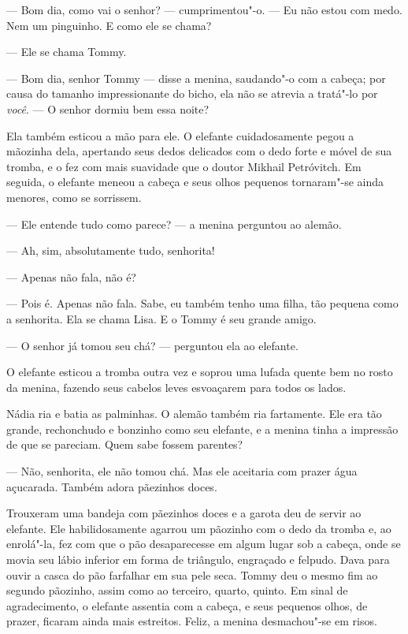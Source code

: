 --- Bom dia, como vai o senhor? --- cumprimentou"-o. --- Eu não estou com
medo. Nem um pinguinho. E como ele se chama?

--- Ele se chama Tommy.

--- Bom dia, senhor Tommy --- disse a menina, saudando"-o com a cabeça;
por causa do tamanho impressionante do bicho, ela não se atrevia a
tratá"-lo por \emph{você}. --- O senhor dormiu bem essa noite?

Ela também esticou a mão para ele. O elefante cuidadosamente pegou a
mãozinha dela, apertando seus dedos delicados com o dedo forte e móvel
de sua tromba, e o fez com mais suavidade que o doutor Mikhail
Petróvitch. Em seguida, o elefante meneou a cabeça e seus olhos pequenos
tornaram"-se ainda menores, como se sorrissem.

--- Ele entende tudo como parece? --- a menina perguntou ao alemão.

--- Ah, sim, absolutamente tudo, senhorita!

--- Apenas não fala, não é?

--- Pois é. Apenas não fala. Sabe, eu também tenho uma filha, tão
pequena como a senhorita. Ela se chama Lisa. E o Tommy é seu grande
amigo.

--- O senhor já tomou seu chá? --- perguntou ela ao
elefante.

O elefante esticou a tromba outra vez e soprou uma lufada quente bem no
rosto da menina, fazendo seus cabelos leves esvoaçarem para todos os
lados.

Nádia ria e batia as palminhas. O alemão também ria fartamente. Ele era
tão grande, rechonchudo e bonzinho como seu elefante, e a menina tinha a
impressão de que se pareciam. Quem sabe fossem parentes?

--- Não, senhorita, ele não tomou chá. Mas ele aceitaria com prazer água
açucarada. Também adora pãezinhos doces.

Trouxeram uma bandeja com pãezinhos doces e a garota deu de servir ao
elefante. Ele habilidosamente agarrou um pãozinho com o dedo da tromba
e, ao enrolá"-la, fez com que o pão desaparecesse em algum lugar sob a
cabeça, onde se movia seu lábio inferior em forma de triângulo, engraçado e felpudo. Dava para ouvir a casca do pão farfalhar em sua pele seca.
Tommy deu o mesmo fim ao segundo pãozinho, assim como ao terceiro,
quarto, quinto. Em sinal de agradecimento, o elefante assentia com a
cabeça, e seus pequenos olhos, de prazer, ficaram ainda mais estreitos.
Feliz, a menina desmachou"-se em risos.

